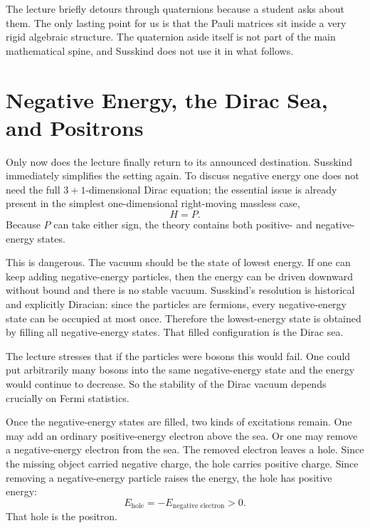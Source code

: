 The lecture briefly detours through quaternions because a student asks about them. The only lasting point for us is that the Pauli matrices sit inside a very rigid algebraic structure. The quaternion aside itself is not part of the main mathematical spine, and Susskind does not use it in what follows.

\section{Negative Energy, the Dirac Sea, and Positrons}

Only now does the lecture finally return to its announced destination. Susskind immediately simplifies the setting again. To discuss negative energy one does not need the full \(3+1\)-dimensional Dirac equation; the essential issue is already present in the simplest one-dimensional right-moving massless case,
\begin{equation}
H=P.
\end{equation}
Because \(P\) can take either sign, the theory contains both positive- and negative-energy states.

This is dangerous. The vacuum should be the state of lowest energy. If one can keep adding negative-energy particles, then the energy can be driven downward without bound and there is no stable vacuum. Susskind's resolution is historical and explicitly Diracian: since the particles are fermions, every negative-energy state can be occupied at most once. Therefore the lowest-energy state is obtained by filling all negative-energy states. That filled configuration is the Dirac sea.

The lecture stresses that if the particles were bosons this would fail. One could put arbitrarily many bosons into the same negative-energy state and the energy would continue to decrease. So the stability of the Dirac vacuum depends crucially on Fermi statistics.

Once the negative-energy states are filled, two kinds of excitations remain. One may add an ordinary positive-energy electron above the sea. Or one may remove a negative-energy electron from the sea. The removed electron leaves a hole. Since the missing object carried negative charge, the hole carries positive charge. Since removing a negative-energy particle raises the energy, the hole has positive energy:
\begin{equation}
E_{\text{hole}}=-E_{\text{negative electron}}>0.
\end{equation}
That hole is the positron.

